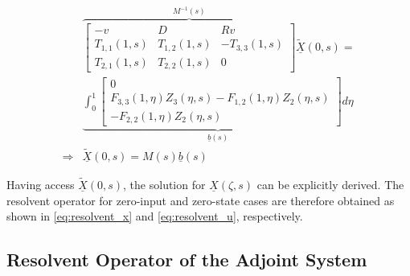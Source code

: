 \begin{equation} \label{eq:BC_AE}
\begin{aligned}
        &\overbrace{\begin{bmatrix}
            -v & D & Rv\\
            T_{1,1}(1,s) & T_{1,2}(1,s) & -T_{3,3}(1,s)\\
            T_{2,1}(1,s) & T_{2,2}(1,s) & 0
        \end{bmatrix}}^{M^{-1}(s)} \underline{\tilde{X}}(0,s) =\\ 
        &\underbrace{\int_0^1 \begin{bmatrix}
            0\\ F_{3,3}(1, \eta) Z_3(\eta,s) - F_{1,2}(1, \eta) Z_2(\eta,s)\\ -F_{2,2}(1, \eta) Z_2(\eta,s)
        \end{bmatrix} d\eta}_{\underline{b}(s)} \\
        \Rightarrow &\underline{\tilde{X}}(0,s) = M(s) \underline{b}(s)
\end{aligned}
\end{equation}

Having access $\underline{\tilde{X}}(0,s)$, the solution for $\underline{X}(\zeta,s)$ can be explicitly derived. The resolvent operator for zero-input and zero-state cases are therefore obtained as shown in \eqref{eq:resolvent_x} and \eqref{eq:resolvent_u}, respectively.



\subsection{Resolvent Operator of the Adjoint System} 
